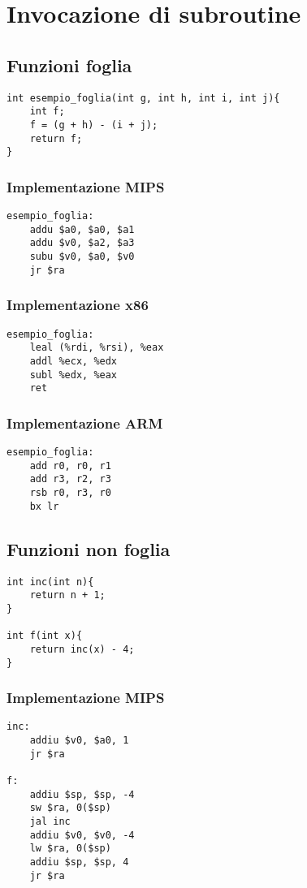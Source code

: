 \documentclass[class=book, crop=false, oneside]{standalone}
\begin{document}
\section{Invocazione di subroutine}
\subsection*{Funzioni foglia}

\begin{verbatim}
int esempio_foglia(int g, int h, int i, int j){
	int f;
	f = (g + h) - (i + j);
	return f;
}
\end{verbatim}

\subsubsection*{Implementazione MIPS}
\begin{verbatim}
esempio_foglia:
	addu $a0, $a0, $a1
	addu $v0, $a2, $a3
	subu $v0, $a0, $v0
	jr $ra
\end{verbatim}

\subsubsection*{Implementazione x86}
\begin{verbatim}
esempio_foglia:
	leal (%rdi, %rsi), %eax
	addl %ecx, %edx
	subl %edx, %eax
	ret
\end{verbatim}

\subsubsection*{Implementazione ARM}
\begin{verbatim}
esempio_foglia:
	add r0, r0, r1
	add r3, r2, r3
	rsb r0, r3, r0
	bx lr
\end{verbatim}

\subsection*{Funzioni non foglia}

\begin{verbatim}
int inc(int n){
	return n + 1;
}

int f(int x){
	return inc(x) - 4;
}
\end{verbatim}

\subsubsection*{Implementazione MIPS}
\begin{verbatim}
inc:
	addiu $v0, $a0, 1
	jr $ra

f:
	addiu $sp, $sp, -4
	sw $ra, 0($sp)
	jal inc
	addiu $v0, $v0, -4
	lw $ra, 0($sp)
	addiu $sp, $sp, 4
	jr $ra
\end{verbatim}
\end{document}
